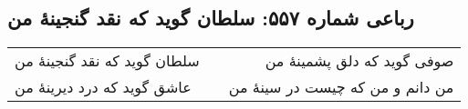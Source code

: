 \begin{center}
\section*{رباعی شماره ۵۵۷: سلطان گوید که نقد گنجینهٔ من}
\label{sec:sh557}
\begin{longtable}{l p{0.5cm} r}
سلطان گوید که نقد گنجینهٔ من
&&
صوفی گوید که دلق پشمینهٔ من
\\
عاشق گوید که درد دیرینهٔ من
&&
من دانم و من که چیست در سینهٔ من
\\
\end{longtable}
\end{center}
